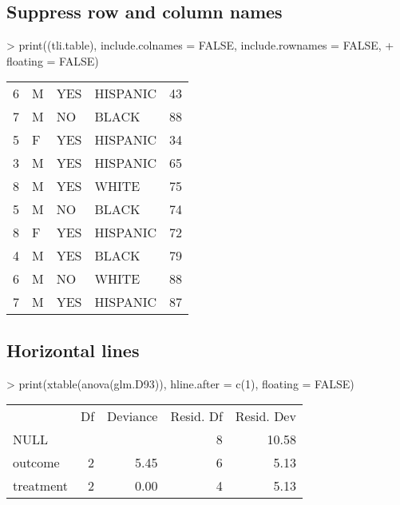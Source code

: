 \documentclass[letterpaper]{article}
\begin{document}
\subsection{Suppress row and column names}
\begin{Schunk}
\begin{Sinput}
> print((tli.table), include.colnames = FALSE, include.rownames = FALSE, 
+     floating = FALSE)
\end{Sinput}
% latex table generated in R 2.6.0 by xtable 1.5-2 package
% Wed Oct 10 14:26:37 2007
\begin{tabular}{r|lp{3cm}l|r|}
  \hline
  \hline
6 & M & YES & HISPANIC & 43 \\
   7 & M & NO & BLACK & 88 \\
    5 & F & YES & HISPANIC &  34 \\
     3 & M & YES & HISPANIC &   65 \\
      8 & M & YES & WHITE &    75 \\
  5 & M & NO & BLACK & 74 \\
   8 & F & YES & HISPANIC & 72 \\
    4 & M & YES & BLACK &  79 \\
     6 & M & NO & WHITE &   88 \\
      7 & M & YES & HISPANIC &    87 \\
   \hline
\end{tabular}\end{Schunk}

\subsection{Horizontal lines}
\begin{Schunk}
\begin{Sinput}
> print(xtable(anova(glm.D93)), hline.after = c(1), floating = FALSE)
\end{Sinput}
% latex table generated in R 2.6.0 by xtable 1.5-2 package
% Wed Oct 10 14:26:37 2007
\begin{tabular}{lrrrr}
  & Df & Deviance & Resid. Df & Resid. Dev \\
 NULL &  &  & 8 & 10.58 \\
   \hline
outcome & 2 & 5.45 & 6 & 5.13 \\
  treatment & 2 & 0.00 & 4 & 5.13 \\
  \end{tabular}\end{Schunk}
\end{document}
